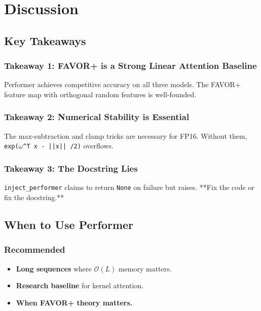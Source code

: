 
\section{Discussion}

\subsection{Key Takeaways}

\subsubsection{Takeaway 1: FAVOR+ is a Strong Linear Attention Baseline}

Performer achieves competitive accuracy on all three models. The FAVOR+ 
feature map with orthogonal random features is well-founded.

\subsubsection{Takeaway 2: Numerical Stability is Essential}

The max-subtraction and clamp tricks are necessary for FP16. Without them, 
\texttt{exp($\omega$\^{}T x - ||x|| /2)} overflows.

\subsubsection{Takeaway 3: The Docstring Lies}

\texttt{inject\_performer} claims to return \texttt{None} on failure but raises. **Fix 
the code or fix the docstring.**

\subsection{When to Use Performer}

\subsubsection{Recommended}

\begin{itemize}
\item \textbf{Long sequences} where $\mathcal{O}(L)$ memory matters.
\item \textbf{Research baseline} for kernel attention.
\item \textbf{When FAVOR+ theory matters.}

\end{itemize}
